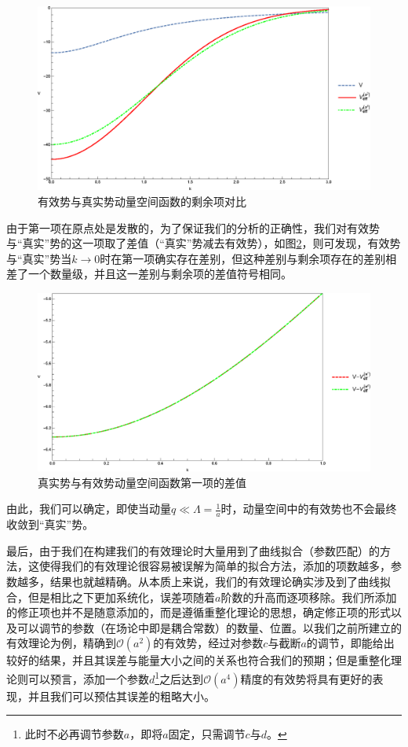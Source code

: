\documentclass[cs4size,titlepage,twoside]{ctexart}
\begin{document}
\begin{figure}[!bp]
	\centering
	\includegraphics[width=6in]{FourierTransformation_3.eps}
	\caption{有效势与真实势动量空间函数的剩余项对比}\label{fourpart2}
\end{figure}
由于第一项在原点处是发散的，为了保证我们的分析的正确性，我们对有效势与“真实”势的这一项取了差值（“真实”势减去有效势），如图\ref{fourminus}，则可发现，有效势与“真实”势当$k\rightarrow0$时在第一项确实存在差别，但这种差别与剩余项存在的差别相差了一个数量级，并且这一差别与剩余项的差值符号相同。

\begin{figure}[!htbp]
\centering
\includegraphics[width=6in]{FourierTransformation_4.eps}
\caption{真实势与有效势动量空间函数第一项的差值}\label{fourminus}
\end{figure}

由此，我们可以确定，即使当动量$q\ll\Lambda=\displaystyle\frac{1}{a}$时，动量空间中的有效势也不会最终收敛到“真实”势。

最后，由于我们在构建我们的有效理论时大量用到了曲线拟合（参数匹配）的方法，这使得我们的有效理论很容易被误解为简单的拟合方法，添加的项数越多，参数越多，结果也就越精确。从本质上来说，我们的有效理论确实涉及到了曲线拟合，但是相比之下更加系统化，误差项随着$a$阶数的升高而逐项移除。我们所添加的修正项也并不是随意添加的，而是遵循重整化理论的思想，确定修正项的形式以及可以调节的参数（在场论中即是耦合常数）的数量、位置。以我们之前所建立的有效理论为例，精确到$\mathcal{O}(a^2)$的有效势，经过对参数$c$与截断$a$的调节，即能给出较好的结果，并且其误差与能量大小之间的关系也符合我们的预期；但是重整化理论则可以预言，添加一个参数$d$\footnote{此时不必再调节参数$a$，即将$a$固定，只需调节$c$与$d$。}之后达到$\mathcal{O}(a^4)$精度的有效势将具有更好的表现，并且我们可以预估其误差的粗略大小。
\cleardoublepage
\end{document}
